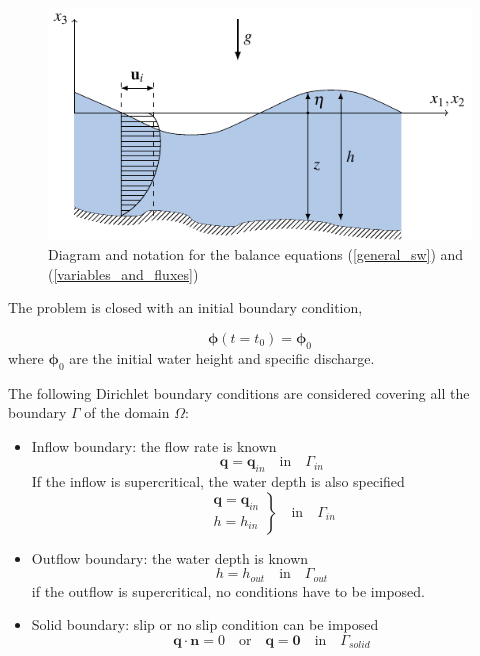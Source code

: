 \documentclass[a4paper,12pt]{elsarticle}
\begin{document}
\begin{figure}
    \centering
    \includegraphics[width=.8\textwidth]{img/fig/diagram.pdf}
    \caption{Diagram and notation for the balance equations (\ref{general_sw}) and (\ref{variables_and_fluxes})}
    \label{diagram}
\end{figure}

The problem is closed with an initial boundary condition,

\begin{equation}
\bm{\phi}(t=t_0) = \bm{\phi}_0
\end{equation}
where $\bm{\phi}_0$ are the initial water height and specific discharge.


The following Dirichlet boundary conditions are considered covering all the boundary $\Gamma$ of the domain $\Omega$:
\begin{itemize}
    \item Inflow boundary: the flow rate is known
    \begin{equation*}
        \mathbf{q} = \mathbf{q}_{in} \quad \text{in} \quad \Gamma_{in}
    \end{equation*}
    If the inflow is supercritical, the water depth is also specified
    \begin{equation*}
        \left.\begin{matrix}
        \mathbf{q} = \mathbf{q}_{in} \\
        h = h_{in}
        \end{matrix}\right\}
        \quad \text{in} \quad \Gamma_{in}
    \end{equation*}
    \item Outflow boundary: the water depth is known
    \begin{equation*}
        h = h_{out} \quad \text{in} \quad \Gamma_{out}
    \end{equation*}
    if the outflow is supercritical, no conditions have to be imposed.
    \item Solid boundary: slip or no slip condition can be imposed
    \begin{equation*}
        \mathbf{q} \cdot \mathbf{n} = 0 \quad \text{or} \quad \mathbf{q} = \mathbf{0} \quad \text{in} \quad \Gamma_{solid}
    \end{equation*}
\end{itemize}
\end{document}
